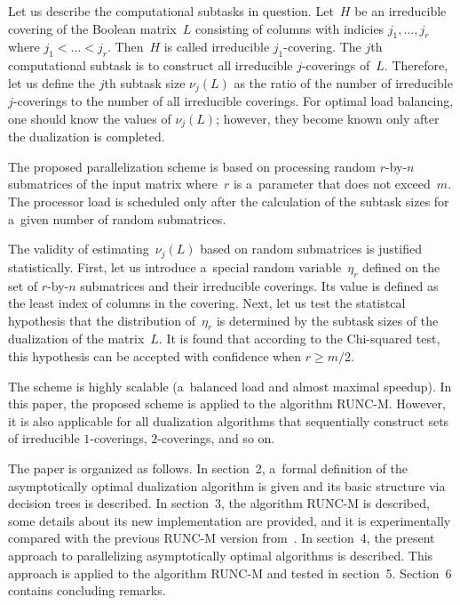 \begin{multicols}{2}
{}

Let us describe the computational subtasks in question. Let~$H$ be
an irreducible covering of the Boolean matrix~$L$ consisting of
columns with indicies $j_1,\dots, j_r$ where $j_1<\dots<j_r$.
Then~$H$ is called {irreducible $j_1$-covering}. The $j$th
computational subtask is to construct all irreducible
$j$-coverings of~$L$. Therefore, let us define the $j$th subtask size
$\nu_j(L)$ as the ratio of the number of irreducible $j$-coverings
to the number of all irreducible coverings.
For optimal load balancing, one should know the values of
$\nu_j(L)$; however, they become known only after the dualization
is completed.


The proposed parallelization scheme is based on processing random
$r$-by-$n$ submatrices of the input matrix where~$r$ is 
a~parameter that does not exceed~$m$.
The processor load is scheduled only after the calculation of the
subtask sizes for a~given number of random submatrices.
{

}

The validity of estimating~$\nu_j(L)$ based on random submatrices
is justified statistically.
First, let us introduce a~special random variable~$\eta_r$ defined on
the set of $r$-by-$n$ submatrices and their irreducible coverings.
Its value is defined as the least index of columns in the covering.
Next, let us test the statistcal hypothesis that the distribution 
of~$\eta_r$ is determined by the subtask sizes of the dualization of
the matrix~$L$.
It is found that according to the Chi-squared test, this
hypothesis can be accepted with confidence when $r \ge m/2$.

The scheme is highly scalable (a~balanced load and almost maximal
speedup). In this paper, the proposed scheme is applied to the
algorithm RUNC-M. However, it is also applicable for all
dualization algorithms that sequentially construct sets of
irreducible $1$-coverings, $2$-coverings, and so on.


The paper is organized as follows. In section~2,  a~formal
definition of the asymptotically optimal dualization algorithm is given and
 its basic structure via decision trees is described. In section~3, 
the algorithm RUNC-M is described, some details about its new
implementation are provided, and it is experimentally compared with the previous
RUNC-M version from~\cite{DP2015}.  In section~4, the present approach to parallelizing
asymptotically optimal algorithms is described. This
approach is applied to the algorithm RUNC-M and tested in section~5. 
Section~6 contains concluding remarks.
{

}
\end{multicols}
